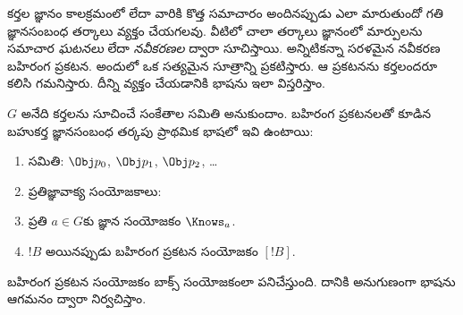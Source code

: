 \documentclass[../../../include/open-logic-section]{subfiles}
\begin{document}


కర్తల జ్ఞానం కాలక్రమంలో లేదా వారికి కొత్త సమాచారం
అందినప్పుడు ఎలా మారుతుందో గతి జ్ఞానసంబంధ తర్కాలు
వ్యక్తం చేయగలవు. వీటిలో చాలా తర్కాలు జ్ఞానంలో మార్పులను సమాచార
\emph{ఘటనలు} లేదా \emph{నవీకరణల} ద్వారా సూచిస్తాయి.
అన్నిటికన్నా సరళమైన నవీకరణ బహిరంగ ప్రకటన.
అందులో ఒక సత్యమైన సూత్రాన్ని ప్రకటిస్తారు. ఆ ప్రకటనను
కర్తలందరూ కలిసి గమనిస్తారు. దీన్ని వ్యక్తం చేయడానికి
భాషను ఇలా విస్తరిస్తాం.

\begin{defn}
$G$ అనేది కర్తలను సూచించే సంకేతాల సమితి అనుకుందాం.
బహిరంగ ప్రకటనలతో కూడిన బహుకర్త జ్ఞానసంబంధ తర్కపు
ప్రాథమిక భాషలో ఇవి ఉంటాయి:
\begin{enumerate}
  \item {}
     సమితి: $\Obj
    p_0$, $\Obj p_1$, $\Obj p_2$, \dots
  \item ప్రతిజ్ఞావాక్య సంయోజకాలు: \startycommalist
  \item ప్రతి $a \in G$కు జ్ఞాన సంయోజకం $\Knows_a$.
  \item $!B$  అయినప్పుడు బహిరంగ ప్రకటన సంయోజకం $[!B]$.
\end{enumerate}
\end{defn}

బహిరంగ ప్రకటన సంయోజకం బాక్స్ సంయోజకంలా పనిచేస్తుంది.
దానికి అనుగుణంగా భాషను ఆగమనం ద్వారా నిర్వచిస్తాం.
\end{document}
